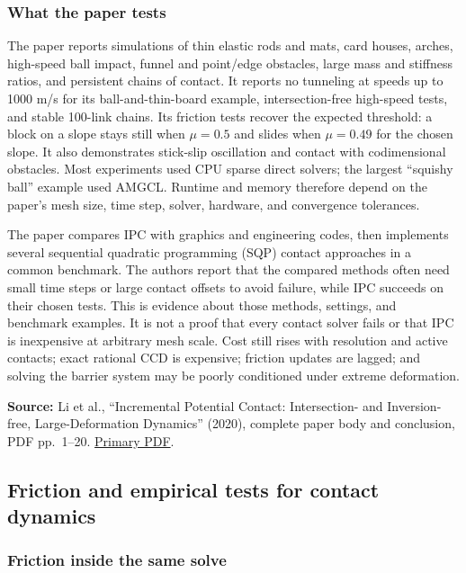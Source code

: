 \subsubsection{What the paper tests}\label{04-visual-computing-ii-ch029-what-the-paper-tests}

The paper reports simulations of thin elastic rods and mats, card houses, arches, high-speed ball impact, funnel and point/edge obstacles, large mass and stiffness ratios, and persistent chains of contact. It reports no tunneling at speeds up to 1000 m/s for its ball-and-thin-board example, intersection-free high-speed tests, and stable 100-link chains. Its friction tests recover the expected threshold: a block on a slope stays still when \(\mu=0.5\) and slides when \(\mu=0.49\) for the chosen slope. It also demonstrates stick-slip oscillation and contact with codimensional obstacles. Most experiments used CPU sparse direct solvers; the largest ``squishy ball'' example used AMGCL. Runtime and memory therefore depend on the paper's mesh size, time step, solver, hardware, and convergence tolerances.

The paper compares IPC with graphics and engineering codes, then implements several sequential quadratic programming (SQP) contact approaches in a common benchmark. The authors report that the compared methods often need small time steps or large contact offsets to avoid failure, while IPC succeeds on their chosen tests. This is evidence about those methods, settings, and benchmark examples. It is not a proof that every contact solver fails or that IPC is inexpensive at arbitrary mesh scale. Cost still rises with resolution and active contacts; exact rational CCD is expensive; friction updates are lagged; and solving the barrier system may be poorly conditioned under extreme deformation.

\textbf{Source:} Li et al., ``Incremental Potential Contact: Intersection- and Inversion-free, Large-Deformation Dynamics'' (2020), complete paper body and conclusion, PDF pp.~1--20. \href{https://ipc-sim.github.io/file/IPC-paper-350ppi.pdf}{Primary PDF}.

\subsection{Friction and empirical tests for contact dynamics}\label{04-visual-computing-ii-ch029-friction-and-empirical-tests-for-contact-dynamics}

\subsubsection{Friction inside the same solve}\label{04-visual-computing-ii-ch029-friction-inside-the-same-solve-1}

